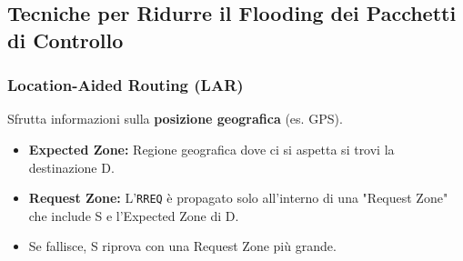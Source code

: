 \documentclass{article}
\begin{document}
\subsection{Tecniche per Ridurre il Flooding dei Pacchetti di Controllo}
\subsubsection{Location-Aided Routing (LAR)}
Sfrutta informazioni sulla \textbf{posizione geografica} (es. GPS).
\begin{itemize}
    \item \textbf{Expected Zone:} Regione geografica dove ci si aspetta si trovi la destinazione D.
    \item \textbf{Request Zone:} L'\texttt{RREQ} è propagato solo all'interno di una "Request Zone" che include S e l'Expected Zone di D.
    \item Se fallisce, S riprova con una Request Zone più grande.
\end{itemize}
\end{document}
